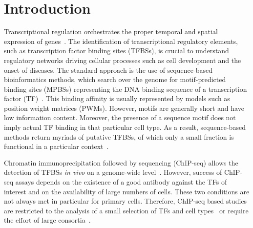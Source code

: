 \documentclass{bioinfo}
\begin{document}
\section{Introduction}
\label{sec:introduction}

Transcriptional regulation orchestrates the proper temporal and spatial
expression of genes~\citep{maston2006}. The identification of transcriptional
regulatory elements, such as transcription factor binding sites (TFBSs),
is crucial to understand regulatory networks driving cellular processes
such as cell development and the onset of diseases. The standard approach
is the use of sequence-based bioinformatics methods, which search over the
genome for motif-predicted binding sites (MPBSs) representing the DNA binding
sequence of a transcription factor (TF)~\citep{stormo2000}. This binding
affinity is usually represented by models such as position weight matrices (PWMs).
However, motifs are generally short and have low information content.
Moreover, the presence of a sequence motif does not imply actual TF binding
in that particular cell type. As a result, sequence-based methods return myriads
of putative TFBSs, of which only a small fraction is functional in a particular
context~\citep{maston2006}.

Chromatin immunoprecipitation followed by sequencing (ChIP-seq) allows the
detection of TFBSs \emph{in vivo} on a genome-wide level~\citep{landt2012}.
However, success of ChIP-seq assays depends on the existence of a good antibody
against the TFs of interest and on the availability of large numbers of cells.
These two conditions are not always met in particular for primary cells.
Therefore, ChIP-seq based studies are restricted to the analysis of a small
selection of TFs and cell types~\citep{kim2008,ouyang2009}
or require the effort of large consortia~\citep{encode2012}.
\end{document}
